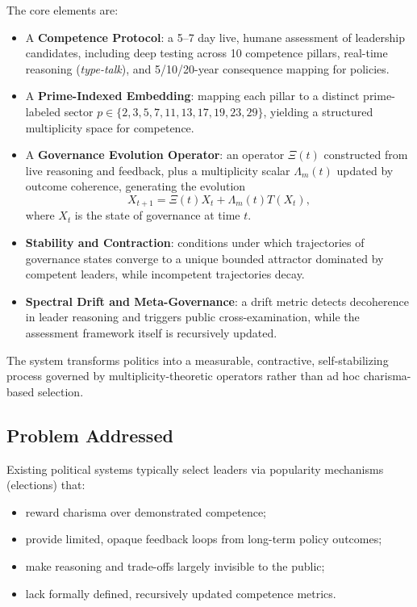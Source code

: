 \documentclass[11pt]{article}
\begin{document}
The core elements are:
\begin{itemize}[leftmargin=1.5em]
    \item A \textbf{Competence Protocol}: a 5--7 day live, humane assessment of leadership candidates, including deep testing across 10 competence pillars, real-time reasoning (\emph{type-talk}), and 5/10/20-year consequence mapping for policies.
    \item A \textbf{Prime-Indexed Embedding}: mapping each pillar to a distinct prime-labeled sector \(p \in \{2,3,5,7,11,13,17,19,23,29\}\), yielding a structured multiplicity space for competence.
    \item A \textbf{Governance Evolution Operator}: an operator \(\Xi(t)\) constructed from live reasoning and feedback, plus a multiplicity scalar \(\Lambda_m(t)\) updated by outcome coherence, generating the evolution
    \[
      X_{t+1} = \Xi(t) X_t + \Lambda_m(t) T(X_t),
    \]
    where \(X_t\) is the state of governance at time \(t\).
    \item \textbf{Stability and Contraction}: conditions under which trajectories of governance states converge to a unique bounded attractor dominated by competent leaders, while incompetent trajectories decay.
    \item \textbf{Spectral Drift and Meta-Governance}: a drift metric detects decoherence in leader reasoning and triggers public cross-examination, while the assessment framework itself is recursively updated.
\end{itemize}

The system transforms politics into a measurable, contractive, self-stabilizing process governed by multiplicity-theoretic operators rather than ad hoc charisma-based selection.

\subsection{Problem Addressed}

Existing political systems typically select leaders via popularity mechanisms (elections) that:
\begin{itemize}[leftmargin=1.5em]
    \item reward charisma over demonstrated competence;
    \item provide limited, opaque feedback loops from long-term policy outcomes;
    \item make reasoning and trade-offs largely invisible to the public;
    \item lack formally defined, recursively updated competence metrics.
\end{itemize}
\end{document}
